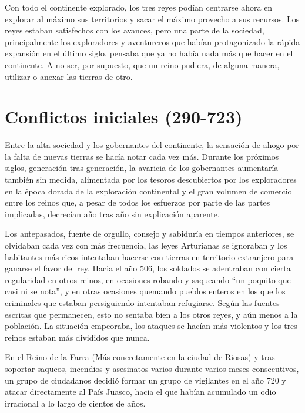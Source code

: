\par 
Con todo el continente explorado, los tres reyes podían centrarse ahora en explorar al máximo sus territorios y sacar el máximo provecho a sus recursos. Los reyes estaban satisfechos con los avances, pero una parte de la sociedad, principalmente los exploradores y aventureros que habían protagonizado la rápida expansión en el último siglo, pensaba que ya no había nada más que hacer en el continente. A no ser, por supuesto, que un reino pudiera, de alguna manera, utilizar o anexar las tierras de otro.

\section*{Conflictos iniciales (290-723)}

Entre la alta sociedad y los gobernantes del continente, la sensación de ahogo por la falta de nuevas tierras se hacía notar cada vez más. Durante los próximos siglos, generación tras generación, la avaricia de los gobernantes aumentaría también sin medida, alimentada por los tesoros descubiertos por los exploradores en la época dorada de la exploración continental y el gran volumen de comercio entre los reinos que, a pesar de todos los esfuerzos por parte de las partes implicadas, decrecían año tras año sin explicación aparente. 
\par
Los antepasados, fuente de orgullo, consejo y sabiduría en tiempos anteriores, se olvidaban cada vez con más frecuencia, las leyes Arturianas se ignoraban y los habitantes más ricos intentaban hacerse con tierras en territorio extranjero para ganarse el favor del rey. Hacia el año 506, los soldados se adentraban con cierta regularidad en otros reinos, en ocasiones robando y saqueando ``un poquito que casi ni se nota'', y en otras ocasiones quemando pueblos enteros en los que los criminales que estaban persiguiendo intentaban refugiarse. Según las fuentes escritas que permanecen, esto no sentaba bien a los otros reyes, y aún menos a la población. La situación empeoraba, los ataques se hacían más violentos y los tres reinos estaban más divididos que nunca.
\par
En el Reino de la Farra (Más concretamente en la ciudad de Riosas) y tras soportar saqueos, incendios y asesinatos varios durante varios meses consecutivos, un grupo de ciudadanos decidió formar un grupo de vigilantes en el año 720 y atacar directamente al País Juasco, hacia el que habían acumulado un odio irracional a lo largo de cientos de años. 
\par 

